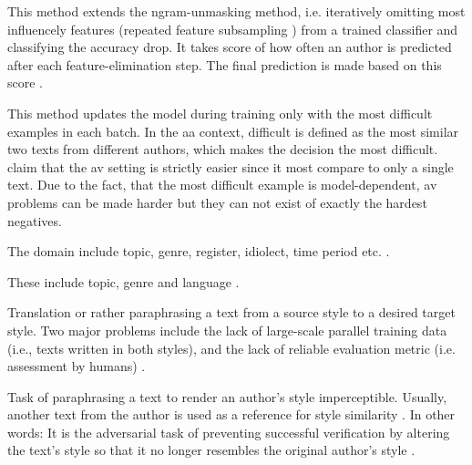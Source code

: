 \begin{definition}
    This method extends the ngram-unmasking method, i.e. iteratively omitting most influencely features (repeated feature subsampling \cite{koppel_determining_2014})
    from a trained classifier and classifying the accuracy drop.
    It takes score of how often an author is predicted after each feature-elimination step.
    The final prediction is made based on this score \cite{tyo_state_2022}.
\end{definition}


\begin{definition}
    This method updates the model during training only with the most difficult examples in each batch.
    In the \ac{aa} context, difficult is defined as the most similar two texts from different authors, 
    which makes the decision the most difficult.
    \citet{tyo_state_2022} claim that the \ac{av} setting is strictly easier since 
    it most compare to only a single text.
    Due to the fact, that the most difficult example is model-dependent, \ac{av} problems can be made harder 
    but they can not exist of exactly the hardest negatives.
\end{definition}

\begin{definition}
    [Domain]
    The domain include topic, genre, register, idiolect, time period etc. \cite{bischoff_importance_2020}.
\end{definition}
  
\begin{definition}
    These include topic, genre and language \cite{bischoff_importance_2020}.
\end{definition}

\begin{definition}
    Translation or rather paraphrasing a text from a source style to a desired target style.
    Two major problems include the lack of large-scale parallel training data (i.e., texts written in both styles), 
    and the lack of reliable evaluation metric (i.e. assessment by humans) \cite{bischoff_importance_2020}.
\end{definition}

\begin{definition}
    Task of paraphrasing a text to render an author's style imperceptible.
    Usually, another text from the author is used as a reference for style similarity \cite{bischoff_importance_2020}.
    In other words: It is the adversarial task of preventing successful verification by altering the text's style so that 
    it no longer resembles the original author's style \cite{bevendorff_divergence_based_2020}.
\end{definition}

